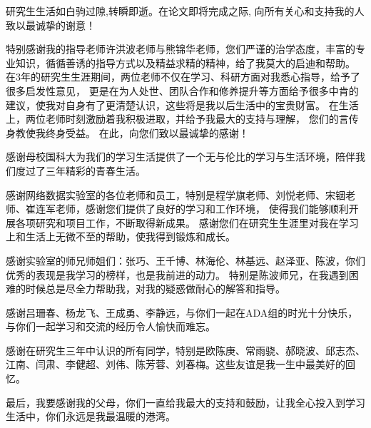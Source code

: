 
\begin{ack}

研究生生活如白驹过隙,转瞬即逝。在论文即将完成之际, 向所有关心和支持我的人致以最诚挚的谢意！


特别感谢我的指导老师许洪波老师与熊锦华老师，您们严谨的治学态度，丰富的专业知识，循循善诱的指导方式以及精益求精的精神，给了我莫大的启迪和帮助。
在3年的研究生生涯期间，两位老师不仅在学习、科研方面对我悉心指导，给予了很多启发性意见，
更是在为人处世、团队合作和修养提升等方面给予很多中肯的建议，使我对自身有了更清楚认识，这些将是我以后生活中的宝贵财富。
在生活上，两位老师时刻激励着我积极进取，并给予我最大的支持与理解，
您们的言传身教使我终身受益。
在此，向您们致以最诚挚的感谢！

感谢母校国科大为我们的学习生活提供了一个无与伦比的学习与生活环境，陪伴我们度过了三年精彩的青春生活。


感谢网络数据实验室的各位老师和员工，特别是程学旗老师、刘悦老师、宋铟老师、崔连军老师，感谢您们提供了良好的学习和工作环境，
使得我们能够顺利开展各项研究和项目工作，不断取得新成果。
感谢您们在研究生生涯里对我在学习上和生活上无微不至的帮助，使我得到锻炼和成长。


感谢实验室的师兄师姐们：张巧、王千博、林海伦、林基远、赵泽亚、陈波，你们优秀的表现是我学习的榜样，也是我前进的动力。
特别是陈波师兄，在我遇到困难的时候总是尽全力帮助我，对我的疑惑做耐心的解答和指导。

感谢吕珊春、杨龙飞、王成勇、李静远，与你们一起在ADA组的时光十分快乐，与你们一起学习和交流的经历令人愉快而难忘。


感谢在研究生三年中认识的所有同学，特别是欧陈庚、常雨骁、郝晓波、邱志杰、江南、闫肃、李健超、刘伟、陈芳蓉、刘春梅。这些友谊是我一生中最美好的回忆。


最后，我要感谢我的父母，你们一直给我最大的支持和鼓励，让我全心投入到学习生活中，你们永远是我最温暖的港湾。


\end{ack}

